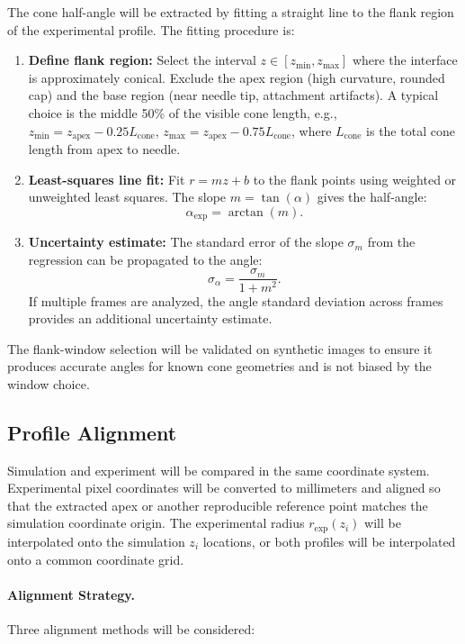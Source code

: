 The cone half-angle will be extracted by fitting a straight line to the flank region of the experimental profile. The fitting procedure is:
\begin{enumerate}
    \item \textbf{Define flank region:} Select the interval $z \in [z_{\min}, z_{\max}]$ where the interface is approximately conical. Exclude the apex region (high curvature, rounded cap) and the base region (near needle tip, attachment artifacts). A typical choice is the middle 50\% of the visible cone length, e.g., $z_{\min} = z_{\text{apex}} - 0.25 L_{\text{cone}}$, $z_{\max} = z_{\text{apex}} - 0.75 L_{\text{cone}}$, where $L_{\text{cone}}$ is the total cone length from apex to needle.
    \item \textbf{Least-squares line fit:} Fit $r = m z + b$ to the flank points using weighted or unweighted least squares. The slope $m = \tan(\alpha)$ gives the half-angle:
    \begin{equation}
    \alpha_{\exp} = \arctan(m).
    \end{equation}
    \item \textbf{Uncertainty estimate:} The standard error of the slope $\sigma_m$ from the regression can be propagated to the angle:
    \begin{equation}
    \sigma_{\alpha} = \frac{\sigma_m}{1 + m^2}.
    \end{equation}
    If multiple frames are analyzed, the angle standard deviation across frames provides an additional uncertainty estimate.
\end{enumerate}

The flank-window selection will be validated on synthetic images to ensure it produces accurate angles for known cone geometries and is not biased by the window choice.

\subsection{Profile Alignment}

Simulation and experiment will be compared in the same coordinate system. Experimental pixel coordinates will be converted to millimeters and aligned so that the extracted apex or another reproducible reference point matches the simulation coordinate origin. The experimental radius $r_{\mathrm{exp}}(z_i)$ will be interpolated onto the simulation $z_i$ locations, or both profiles will be interpolated onto a common coordinate grid.

\paragraph{Alignment Strategy.} Three alignment methods will be considered:

